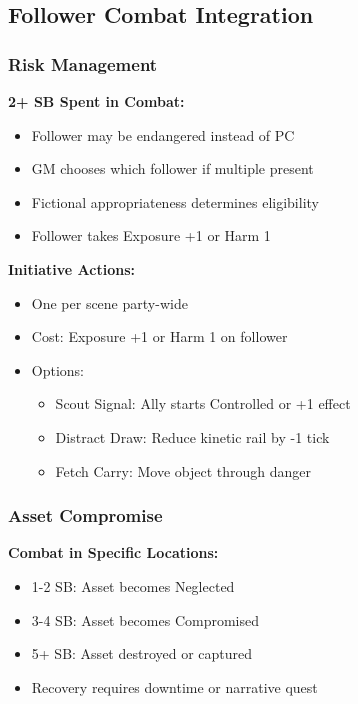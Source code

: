 \documentclass[11pt,letterpaper]{article}
\begin{document}
\subsection{Follower Combat Integration}

\subsubsection{Risk Management}

\textbf{2+ SB Spent in Combat:}
\begin{itemize}[leftmargin=*]
    \item Follower may be endangered instead of PC
    \item GM chooses which follower if multiple present
    \item Fictional appropriateness determines eligibility
    \item Follower takes Exposure +1 or Harm 1
\end{itemize}

\textbf{Initiative Actions:}
\begin{itemize}[leftmargin=*]
    \item One per scene party-wide
    \item Cost: Exposure +1 or Harm 1 on follower
    \item Options:
    \begin{itemize}
        \item Scout Signal: Ally starts Controlled or +1 effect
        \item Distract Draw: Reduce kinetic rail by -1 tick
        \item Fetch Carry: Move object through danger
    \end{itemize}
\end{itemize}

\subsubsection{Asset Compromise}

\textbf{Combat in Specific Locations:}
\begin{itemize}[leftmargin=*]
    \item 1-2 SB: Asset becomes Neglected
    \item 3-4 SB: Asset becomes Compromised
    \item 5+ SB: Asset destroyed or captured
    \item Recovery requires downtime or narrative quest
\end{itemize}
\end{document}
